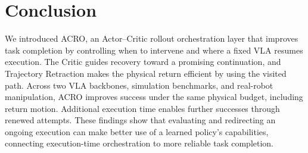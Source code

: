 \section{Conclusion}

We introduced ACRO, an Actor--Critic rollout orchestration layer that improves task completion by controlling when to intervene and where a fixed VLA resumes execution. The Critic guides recovery toward a promising continuation, and Trajectory Retraction makes the physical return efficient by using the visited path. Across two VLA backbones, simulation benchmarks, and real-robot manipulation, ACRO improves success under the same physical budget, including return motion. Additional execution time enables further successes through renewed attempts. These findings show that evaluating and redirecting an ongoing execution can make better use of a learned policy's capabilities, connecting execution-time orchestration to more reliable task completion.
